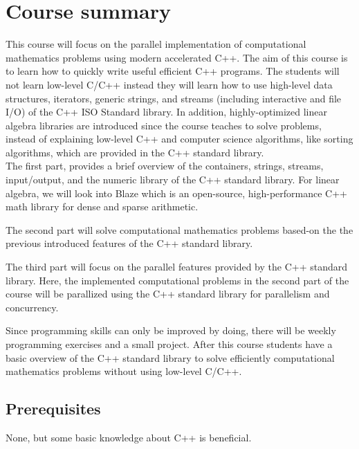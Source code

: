 \documentclass[11pt,letterpaper]{article}
\begin{document}
\section*{Course summary}
This course will focus on the parallel implementation of computational mathematics problems using modern accelerated C++. The aim of this course is to learn how to quickly write useful efficient C++ programs. The students will not learn low-level C/C++ instead they will learn how to use high-level data structures, iterators, generic strings, and streams (including interactive and file I/O) of the C++ ISO Standard library. In addition, highly-optimized linear algebra libraries are introduced since the course teaches to solve problems, instead of explaining low-level C++ and computer science algorithms, like sorting algorithms, which are provided in the C++ standard library.\\

\noindent
The first part, provides a brief overview of the containers, strings, streams, input/output, and the numeric library of the C++ standard library. For linear algebra, we will look into Blaze which is an open-source, high-performance C++ math library for dense and sparse arithmetic.

The second part will solve computational mathematics problems based-on the the previous introduced features of the C++ standard library.

The third part will focus on the parallel features provided by the C++ standard library. Here, the implemented computational problems in the second part of the course will be parallized using the C++ standard library for parallelism and concurrency.

Since programming skills can only be improved by doing, there will be weekly programming exercises and a small project. After this course students have a basic overview of the C++ standard library to solve efficiently computational mathematics problems without using low-level C/C++.
\subsection*{Prerequisites}
None, but some basic knowledge about C++ is beneficial. 
\end{document}
